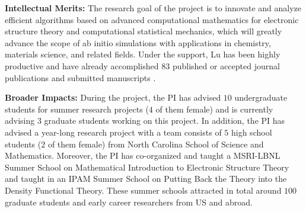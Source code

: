 \documentclass[12pt]{article}
\begin{document}
\smallskip
\textbf{Intellectual Merits:} The research goal of the
project is to innovate and analyze efficient algorithms based on
advanced computational mathematics for electronic structure theory and
computational statistical mechanics, which will greatly advance the
scope of ab initio simulations with applications in chemistry,
materials science, and related fields.  Under the support, Lu has been
highly productive and have already accomplished $83$ published or
accepted journal publications \cite{DelgadilloLuYang:16, LinLu:16,
  LiLu:16, LuYing:16f, LiLuSun:17, YuLuAbramsVandenEijnden:16,
  LuWirthYang:16, LuYing:16, LaiLu:16, LiLuYang:15, LuYing:15,
  LuZhou:16, CornelisYang:17, LiLinLu:18, LuYang:17,
  MendlLuLukkarinen:16, NiuLuoLuXiang:17, LiLuSun:17v, GaoLiuLu:17,
  LuThicke:17, GaoLiuLu:17w, WatsonLuWeinstein:17,
  LinLuVandenEijnden:18, LuYang:17c, XLiLu:17, LiLuYang:17, QLiLu:17,
  LuZhou:18, DaiLiLu:18, LuSteinerberger:17, YuCorsetti:18,
  LiLiuLu:17, LiLiuLuZhou:18, LuThicke:17c, GaucklerMarzuola:19,
  CaoLu:17, LaiLu:18, DuLiLuTian:18, HuangLuMing:18, LuZhou:18a,
  CaiLu:18surface, DelgadilloLuYang:18, ChenLuOrtner:18, LuYang:18,
  CaiLu:18qkmc, CaoLu:18, LuSteinerberger:18, BarthelLu:18, FangLu:18,
  YouLiLuGe:18, MartinssonLu:19, LuSachsSteinerberger:19+,
  WangLiLu:19, LuSoggeSteinerberger:19, ChenLiLu:19+,
  LuSteinerberger:19+, CaiLuYang:19+, LuSpiliopoulos:18, AnLuYing:19+,
  CaoLuLu:19FP, CaoLuLu:19Lindblad, ChenLiLuWright:19+, HuangLiuLu:19,
  KhooLuYing:19, LiLuWang:19, LiLu:19, LiuLuMargetisMarzuola:19,
  LuLuNolen:19, LuVandenEijnden:19, LuWang:19+, NishimuraDunsonLu:19+,
  ZhuQiuWang:19+, CaoLu:19+} and submitted manuscripts
\cite{CaiLuStubbs, KhooLuYing:uq, LiChengLu, LuOtto,
  LuWatsonWeinstein, ChenLiLuWright:b, LuSteinerberger, LiLuWang,
  ChenLiLuWright, SenSachsLuDunson, AgazziLu, LuLuNolen, ChenLiLu,
  LiLuMao, GaoLiuLuMarzuola, AnHead-GordonLinLu, LiLiLiuLiuLu,
  HolstHu, LiLuMattinglyWang, LuZhou, ThickeWatsonLu, GeLeeLi}.


\smallskip
\textbf{Broader Impacts:} During the  project, the PI has advised $10$ undergraduate students for
summer research projects ($4$ of them female) and is currently
advising $3$ graduate students working on this project. In addition,
the PI has advised a year-long research project with a team consists
of $5$ high school students ($2$ of them female) from North Carolina
School of Science and Mathematics.  Moreover, the PI
has co-organized and taught a MSRI-LBNL Summer School on Mathematical
Introduction to Electronic Structure Theory and taught in an IPAM
Summer School on Putting Back the Theory into the Density Functional
Theory. These summer schools attracted in total around $100$ graduate
students and early career researchers from US and abroad.
\end{document}
